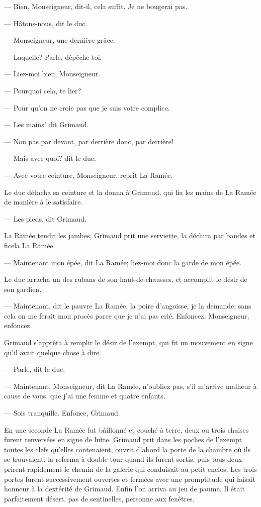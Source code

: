 — Bien, Monseigneur, dit-il, cela suffit. Je ne bougerai pas.

— Hâtons-nous, dit le duc.

— Monseigneur, une dernière grâce.

— Laquelle? Parle, dépêche-toi.

— Liez-moi bien, Monseigneur.

— Pourquoi cela, te lier?

— Pour qu'on ne croie pas que je suis votre complice.

— Les mains! dit Grimaud.

— Non pas par devant, par derrière donc, par derrière!

— Mais avec quoi? dit le duc.

— Avec votre ceinture, Monseigneur, reprit La Ramée.

Le duc détacha sa ceinture et la donna à Grimaud, qui lia les mains de La Ramée de manière à le satisfaire.

— Les pieds, dit Grimaud.

La Ramée tendit les jambes, Grimaud prit une serviette, la déchira par bandes et ficela La Ramée.

— Maintenant mon épée, dit La Ramée; liez-moi donc la garde de mon épée.

Le duc arracha un des rubans de son haut-de-chausses, et accomplit le désir de son gardien.

— Maintenant, dit le pauvre La Ramée, la poire d'angoisse, je la demande; sans cela on me ferait mon procès parce que je n'ai pas crié. Enfoncez, Monseigneur, enfoncez.

Grimaud s'apprêta à remplir le désir de l'exempt, qui fit un mouvement en signe qu'il avait quelque chose à dire.

— Parle, dit le duc.

— Maintenant, Monseigneur, dit La Ramée, n'oubliez pas, s'il m'arrive malheur à cause de vous, que j'ai une femme et quatre enfants.

— Sois tranquille. Enfonce, Grimaud.

En une seconde La Ramée fut bâillonné et couché à terre, deux ou trois chaises furent renversées en signe de lutte. Grimaud prit dans les poches de l'exempt toutes les clefs qu'elles contenaient, ouvrit d'abord la porte de la chambre où ils se trouvaient, la referma à double tour quand ils furent sortis, puis tous deux prirent rapidement le chemin de la galerie qui conduisait au petit enclos. Les trois portes furent successivement ouvertes et fermées avec une promptitude qui faisait honneur à la dextérité de Grimaud. Enfin l'on arriva au jeu de paume. Il était parfaitement désert, pas de sentinelles, personne aux fenêtres.

